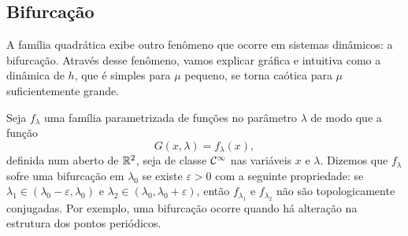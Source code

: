 \subsection{Bifurcação}

A família quadrática exibe outro fenômeno que ocorre em sistemas dinâmicos: a bifurcação.
Através desse fenômeno, vamos explicar gráfica e intuitiva como a dinâmica de $h$, que é simples para $\mu$ pequeno, se torna caótica para $\mu$ suficientemente grande.

Seja $f_\lambda$ uma família parametrizada de funções no parâmetro $\lambda$ de modo que a função
$$G(x, \lambda) = f_\lambda(x),$$
definida num aberto de $\mathbb{R}^2$, seja de classe $\mathcal{C}^\infty$ nas variáveis $x$ e $\lambda$.
Dizemos que $f_\lambda$ sofre uma bifurcação em $\lambda_0$ se existe $\varepsilon > 0$ com a seguinte propriedade: se $\lambda_1 \in (\lambda_0 - \varepsilon, \lambda_0)$ e $\lambda_2 \in (\lambda_0, \lambda_0 + \varepsilon)$, então $f_{\lambda_1}$ e $f_{\lambda_2}$ não são topologicamente conjugadas.
Por exemplo, uma bifurcação ocorre quando há alteração na estrutura dos pontos periódicos.

